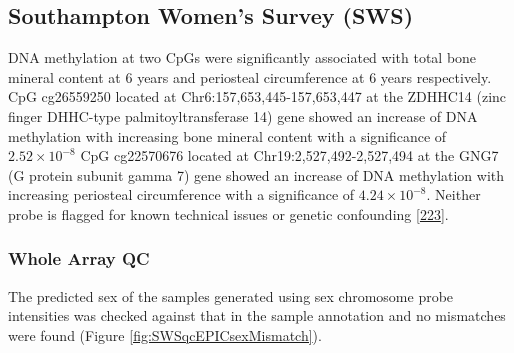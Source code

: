 \documentclass[
]{book}
\begin{document}
\hypertarget{southampton-womens-survey-sws}{%
\subsection{Southampton Women's Survey (SWS)}\label{southampton-womens-survey-sws}}

DNA methylation at two CpGs were significantly associated with total bone mineral content at 6 years and periosteal circumference at 6 years respectively.
CpG cg26559250 located at Chr6:157,653,445-157,653,447 at the ZDHHC14 (zinc finger DHHC-type palmitoyltransferase 14) gene showed an increase of DNA methylation with increasing bone mineral content with a significance of \(2.52\times 10^{-8}\)
CpG cg22570676 located at Chr19:2,527,492-2,527,494 at the GNG7 (G protein subunit gamma 7) gene showed an increase of DNA methylation with increasing periosteal circumference with a significance of \(4.24\times 10^{-8}\).
Neither probe is flagged for known technical issues or genetic confounding {[}\protect\hyperlink{ref-Zhou2017}{223}{]}.

\hypertarget{whole-array-qc-2}{%
\subsubsection{Whole Array QC}\label{whole-array-qc-2}}

The predicted sex of the samples generated using sex chromosome probe intensities was checked against that in the sample annotation and no mismatches were found (Figure \ref{fig:SWSqcEPICsexMismatch}).
\end{document}
